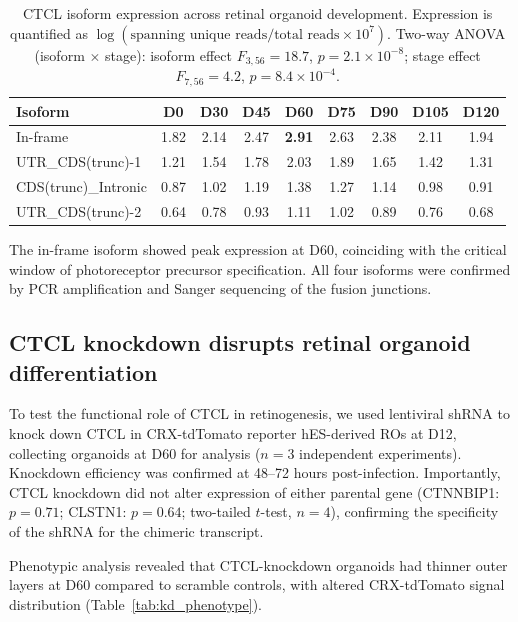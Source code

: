 \documentclass[11pt]{article}
\begin{document}
\begin{table}[H]
\centering
\caption{CTCL isoform expression across retinal organoid development. Expression is quantified as $\log(\text{spanning unique reads}/\text{total reads} \times 10^{7})$. Two-way ANOVA (isoform $\times$ stage): isoform effect $F_{3,56} = 18.7$, $p = 2.1 \times 10^{-8}$; stage effect $F_{7,56} = 4.2$, $p = 8.4 \times 10^{-4}$.}
\label{tab:ctcl_isoforms}
\begin{tabular}{lcccccccc}
\toprule
\textbf{Isoform} & \textbf{D0} & \textbf{D30} & \textbf{D45} & \textbf{D60} & \textbf{D75} & \textbf{D90} & \textbf{D105} & \textbf{D120} \\
\midrule
In-frame & 1.82 & 2.14 & 2.47 & \textbf{2.91} & 2.63 & 2.38 & 2.11 & 1.94 \\
UTR\_CDS(trunc)-1 & 1.21 & 1.54 & 1.78 & 2.03 & 1.89 & 1.65 & 1.42 & 1.31 \\
CDS(trunc)\_Intronic & 0.87 & 1.02 & 1.19 & 1.38 & 1.27 & 1.14 & 0.98 & 0.91 \\
UTR\_CDS(trunc)-2 & 0.64 & 0.78 & 0.93 & 1.11 & 1.02 & 0.89 & 0.76 & 0.68 \\
\bottomrule
\end{tabular}
\end{table}

The in-frame isoform showed peak expression at D60, coinciding with the critical window of photoreceptor precursor specification. All four isoforms were confirmed by PCR amplification and Sanger sequencing of the fusion junctions.

\subsection{CTCL knockdown disrupts retinal organoid differentiation}

To test the functional role of CTCL in retinogenesis, we used lentiviral shRNA to knock down CTCL in CRX-tdTomato reporter hES-derived ROs at D12, collecting organoids at D60 for analysis ($n = 3$ independent experiments). Knockdown efficiency was confirmed at 48--72 hours post-infection. Importantly, CTCL knockdown did not alter expression of either parental gene (CTNNBIP1: $p = 0.71$; CLSTN1: $p = 0.64$; two-tailed $t$-test, $n = 4$), confirming the specificity of the shRNA for the chimeric transcript.

Phenotypic analysis revealed that CTCL-knockdown organoids had thinner outer layers at D60 compared to scramble controls, with altered CRX-tdTomato signal distribution (Table~\ref{tab:kd_phenotype}).
\end{document}
